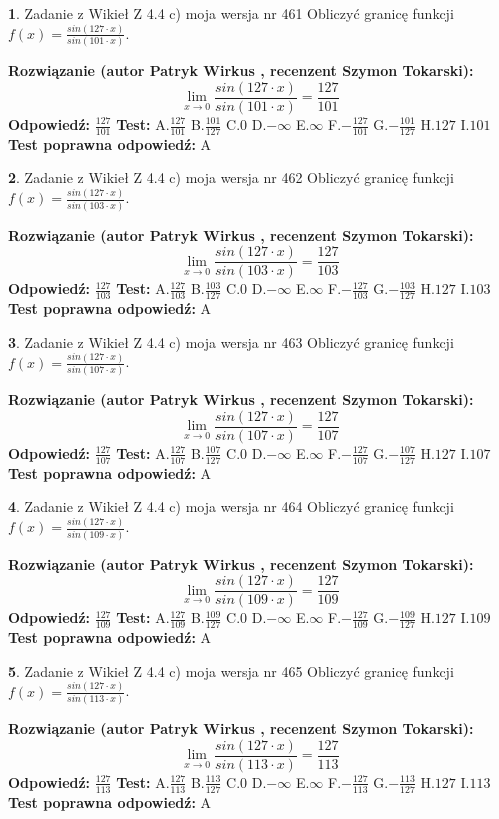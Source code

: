 \documentclass[12pt, a4paper]{article}
\theoremstyle{definition} %
\newtheorem{zad}{}
\newcommand{\zadStart}[1]{\begin{zad}#1\newline}
\newcommand{\zadStop}{\end{zad}}
\newcommand{\rozwStart}[2]{\noindent \textbf{Rozwiązanie (autor #1 , recenzent #2): }\newline}
\newcommand{\rozwStop}{\newline}
\newcommand{\odpStart}{\noindent \textbf{Odpowiedź:}\newline}
\newcommand{\odpStop}{\newline}
\newcommand{\testStart}{\noindent \textbf{Test:}\newline}
\newcommand{\testStop}{\newline}
\newcommand{\kluczStart}{\noindent \textbf{Test poprawna odpowiedź:}\newline}
\newcommand{\kluczStop}{\newline}
\begin{document}
\zadStart{Zadanie z Wikieł Z 4.4 c) moja wersja nr 461}
Obliczyć granicę funkcji $f(x)=\frac{sin(127\cdot x)}{sin(101\cdot x)}$.
\zadStop
\rozwStart{Patryk Wirkus}{Szymon Tokarski}
$$\lim\limits_{x\to 0}\frac{sin(127\cdot x)}{sin(101\cdot x)}=
\frac{127}{101}$$
\rozwStop
\odpStart
$\frac{127}{101}$
\odpStop
\testStart
A.$\frac{127}{101}$
B.$\frac{101}{127}$
C.$0$
D.$-\infty$
E.$\infty$
F.$-\frac{127}{101}$
G.$-\frac{101}{127}$
H.$127$
I.$101$
\testStop
\kluczStart
A
\kluczStop



\zadStart{Zadanie z Wikieł Z 4.4 c) moja wersja nr 462}
Obliczyć granicę funkcji $f(x)=\frac{sin(127\cdot x)}{sin(103\cdot x)}$.
\zadStop
\rozwStart{Patryk Wirkus}{Szymon Tokarski}
$$\lim\limits_{x\to 0}\frac{sin(127\cdot x)}{sin(103\cdot x)}=
\frac{127}{103}$$
\rozwStop
\odpStart
$\frac{127}{103}$
\odpStop
\testStart
A.$\frac{127}{103}$
B.$\frac{103}{127}$
C.$0$
D.$-\infty$
E.$\infty$
F.$-\frac{127}{103}$
G.$-\frac{103}{127}$
H.$127$
I.$103$
\testStop
\kluczStart
A
\kluczStop



\zadStart{Zadanie z Wikieł Z 4.4 c) moja wersja nr 463}
Obliczyć granicę funkcji $f(x)=\frac{sin(127\cdot x)}{sin(107\cdot x)}$.
\zadStop
\rozwStart{Patryk Wirkus}{Szymon Tokarski}
$$\lim\limits_{x\to 0}\frac{sin(127\cdot x)}{sin(107\cdot x)}=
\frac{127}{107}$$
\rozwStop
\odpStart
$\frac{127}{107}$
\odpStop
\testStart
A.$\frac{127}{107}$
B.$\frac{107}{127}$
C.$0$
D.$-\infty$
E.$\infty$
F.$-\frac{127}{107}$
G.$-\frac{107}{127}$
H.$127$
I.$107$
\testStop
\kluczStart
A
\kluczStop



\zadStart{Zadanie z Wikieł Z 4.4 c) moja wersja nr 464}
Obliczyć granicę funkcji $f(x)=\frac{sin(127\cdot x)}{sin(109\cdot x)}$.
\zadStop
\rozwStart{Patryk Wirkus}{Szymon Tokarski}
$$\lim\limits_{x\to 0}\frac{sin(127\cdot x)}{sin(109\cdot x)}=
\frac{127}{109}$$
\rozwStop
\odpStart
$\frac{127}{109}$
\odpStop
\testStart
A.$\frac{127}{109}$
B.$\frac{109}{127}$
C.$0$
D.$-\infty$
E.$\infty$
F.$-\frac{127}{109}$
G.$-\frac{109}{127}$
H.$127$
I.$109$
\testStop
\kluczStart
A
\kluczStop



\zadStart{Zadanie z Wikieł Z 4.4 c) moja wersja nr 465}
Obliczyć granicę funkcji $f(x)=\frac{sin(127\cdot x)}{sin(113\cdot x)}$.
\zadStop
\rozwStart{Patryk Wirkus}{Szymon Tokarski}
$$\lim\limits_{x\to 0}\frac{sin(127\cdot x)}{sin(113\cdot x)}=
\frac{127}{113}$$
\rozwStop
\odpStart
$\frac{127}{113}$
\odpStop
\testStart
A.$\frac{127}{113}$
B.$\frac{113}{127}$
C.$0$
D.$-\infty$
E.$\infty$
F.$-\frac{127}{113}$
G.$-\frac{113}{127}$
H.$127$
I.$113$
\testStop
\kluczStart
A
\kluczStop
\end{document}
